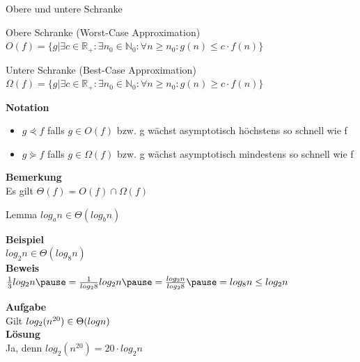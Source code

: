 \documentclass[handout]{beamer}
\begin{document}
\begin{frame}{Obere und untere Schranke}
	\begin{block}{Obere Schranke (Worst-Case Approximation)}
		$O(f) = \{g| \exists c \in \mathbb{R}_+ : \exists n_0 \in \mathbb{N}_0: \forall n \geq n_0 : g(n)\leq c \cdot f(n)\}$
	\end{block}

	\pause
	
	\begin{block}{Untere Schranke (Best-Case Approximation)}
		$\Omega(f) = \{g| \exists c \in \mathbb{R}_+ : \exists n_0 \in \mathbb{N}_0: \forall n \geq n_0 : g(n)\geq c \cdot f(n)\}$
	\end{block}
	\pause
	\textbf{Notation}\\
	\begin{itemize}
		\item $g\curlyeqprec f$ falls $g \in O(f)$ bzw. g wächst asymptotisch höchstens so schnell wie f
		\item $g \curlyeqsucc f $ falls $g \in \Omega (f)$ bzw. g wächst asymptotisch mindestens so schnell wie f
	\end{itemize}
	\pause
	\textbf{Bemerkung}\\
	Es gilt $\Theta (f) = O(f) \cap \Omega (f)$
\end{frame}

\begin{frame}
	\begin{block}{Lemma}
		$log_a n \in \Theta (log_b n)$
	\end{block}
	\textbf{Beispiel}\\
	$log_2 n \in \Theta(log_8 n)$\\
	\pause
	\textbf{Beweis}\\
	$\frac{1}{3} log_2 n \ip= \frac{1}{log_2 8} log_2 n \ip= \frac{log_2 n}{log_2 8} \ip= log_8 n \leq log_2 n$
\end{frame}

\begin{frame}
	\textbf{Aufgabe}\\
	Gilt $log_2(n^{20}) \in \Theta (log \space n)$\\
	\pause
	\textbf{Lösung}\\
	Ja, denn $log_2 (n^{20}) = 20 \cdot log_2 n$
\end{frame}
\end{document}
